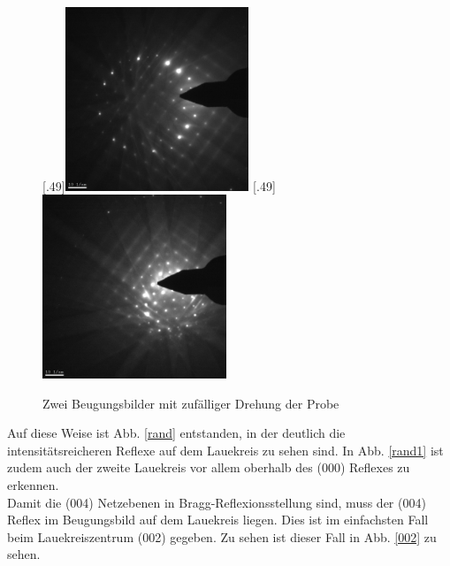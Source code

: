 \documentclass[a4paper,11pt,DIV=11]{scrartcl}
\begin{document}
\begin{figure}[htb]\centering
	[.49\linewidth]{\includegraphics[width=0.49\textwidth]{Versuchsdaten/9/RandomTilt.jpg}}
	[.49\linewidth]{\includegraphics[width=0.49\textwidth]{Versuchsdaten/9/RandomTilt1.jpg}}\\
	\caption{Zwei Beugungsbilder mit zufälliger Drehung der Probe} \label{rands}
\end{figure}

Auf diese Weise ist Abb. \ref{rand} entstanden, in der deutlich die intensitätsreicheren Reflexe auf dem Lauekreis zu sehen sind. In Abb. \ref{rand1} ist zudem auch der zweite Lauekreis vor allem oberhalb des (000) Reflexes zu erkennen. \\
Damit die (004) Netzebenen in Bragg-Reflexionsstellung sind, muss der (004) Reflex im Beugungsbild auf dem Lauekreis liegen. Dies ist im einfachsten Fall beim Lauekreiszentrum (002) gegeben. Zu sehen ist dieser Fall in Abb. \ref{002} zu sehen.
\end{document}
